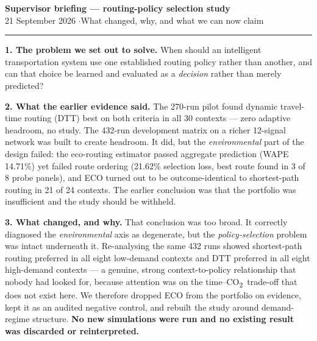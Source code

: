 \documentclass[10pt,a4paper]{article}
\newcommand{\CO}{CO\textsubscript{2}}
\begin{document}
{\large\bfseries Supervisor briefing --- routing-policy selection study}\\[2pt]
{\small 21 September 2026 \quad$\cdot$\quad What changed, why, and what we can now claim}

\vspace{4pt}\hrule\vspace{6pt}

\textbf{1. The problem we set out to solve.}
When should an intelligent transportation system use one established routing policy rather than another, and can that choice be learned and evaluated as a \emph{decision} rather than merely predicted?

\textbf{2. What the earlier evidence said.}
The 270-run pilot found dynamic travel-time routing (DTT) best on both criteria in all 30 contexts --- zero adaptive headroom, no study. The 432-run development matrix on a richer 12-signal network was built to create headroom. It did, but the \emph{environmental} part of the design failed: the eco-routing estimator passed aggregate prediction (WAPE 14.71\%) yet failed route ordering (21.62\% selection loss, best route found in 3 of 8 probe panels), and ECO turned out to be outcome-identical to shortest-path routing in 21 of 24 contexts. The earlier conclusion was that the portfolio was insufficient and the study should be withheld.

\textbf{3. What changed, and why.}
That conclusion was too broad. It correctly diagnosed the \emph{environmental} axis as degenerate, but the \emph{policy-selection} problem was intact underneath it. Re-analysing the same 432 runs showed shortest-path routing preferred in all eight low-demand contexts and DTT preferred in all eight high-demand contexts --- a genuine, strong context-to-policy relationship that nobody had looked for, because attention was on the time--\CO\ trade-off that does not exist here. We therefore dropped ECO from the portfolio on evidence, kept it as an audited negative control, and rebuilt the study around demand-regime structure. \textbf{No new simulations were run and no existing result was discarded or reinterpreted.}
\end{document}
